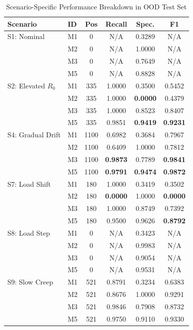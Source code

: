 \documentclass[conference]{IEEEtran}
\begin{document}
\begin{table}[!t]
\caption{Scenario-Specific Performance Breakdown in OOD Test Set}
\label{tab:scenario_breakdown}
\centering
\begingroup
\footnotesize
\setlength{\tabcolsep}{2.0pt}
\begin{tabular*}{\columnwidth}{@{\extracolsep{\fill}}llcccc@{}}
\toprule
\textbf{Scenario} & \textbf{ID} & \textbf{Pos} & \textbf{Recall} & \textbf{Spec.} & \textbf{F1} \\
\midrule
S1: Nominal           & M1 & 0    & N/A    & 0.3289 & N/A \\
                      & M2 & 0    & N/A    & 1.0000 & N/A \\
                      & M3 & 0    & N/A    & 0.7649 & N/A \\
                      & M5 & 0    & N/A    & 0.8828 & N/A \\
\midrule
S2: Elevated $R_0$    & M1 & 335  & 1.0000 & 0.3500 & 0.5452 \\
                      & M2 & 335  & 1.0000 & \textbf{0.0000} & 0.4379 \\
                      & M3 & 335  & 1.0000 & 0.8523 & 0.8407 \\
                      & M5 & 335  & 0.9851 & \textbf{0.9419} & \textbf{0.9231} \\
\midrule
S4: Gradual Drift     & M1 & 1100 & 0.6982 & 0.3684 & 0.7967 \\
                      & M2 & 1100 & 0.6409 & 1.0000 & 0.7812 \\
                      & M3 & 1100 & \textbf{0.9873} & 0.7789 & \textbf{0.9841} \\
                      & M5 & 1100 & \textbf{0.9791} & \textbf{0.9474} & \textbf{0.9872} \\
\midrule
S7: Load Shift        & M1 & 180  & 1.0000 & 0.3419 & 0.3502 \\
                      & M2 & 180  & \textbf{0.0000} & 1.0000 & \textbf{0.0000} \\
                      & M3 & 180  & 1.0000 & 0.8749 & 0.7392 \\
                      & M5 & 180  & 0.9500 & 0.9626 & \textbf{0.8792} \\
\midrule
S8: Load Step         & M1 & 0    & N/A    & 0.3423 & N/A \\
                      & M2 & 0    & N/A    & 0.9983 & N/A \\
                      & M3 & 0    & N/A    & 0.9054 & N/A \\
                      & M5 & 0    & N/A    & 0.9531 & N/A \\
\midrule
S9: Slow Creep        & M1 & 521  & 0.8791 & 0.3234 & 0.6383 \\
                      & M2 & 521  & 0.8676 & 1.0000 & 0.9291 \\
                      & M3 & 521  & 0.9846 & 0.7908 & 0.8732 \\
                      & M5 & 521  & 0.9750 & 0.9110 & 0.9330 \\
\bottomrule
\end{tabular*}
\endgroup
\end{table}
\end{document}
